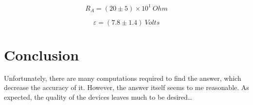\documentclass[12pt]{memoir}
\begin{document}
    \begin{equation*}
        R_A = (20 \pm 5) \times 10^1 ~Ohm
    \end{equation*}

    \begin{equation*}
        \varepsilon = (7.8 \pm 1.4) ~Volts
    \end{equation*}


    \section{Conclusion}\label{sec:conclusion}
    Unfortunately, there are many computations required to find the answer, which decrease the accuracy of it.\newline
    However, the answer itself seems to me reasonable.\newline
    As expected, the quality of the devices leaves much to be desired\ldots
\end{document}
